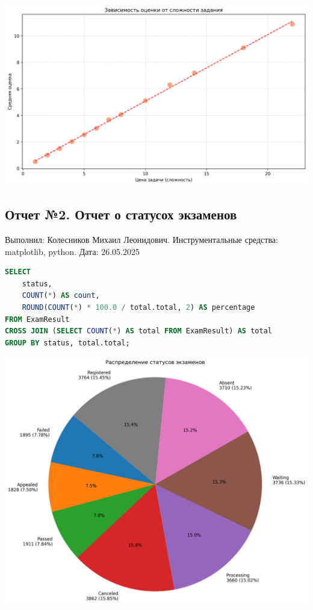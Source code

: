 \documentclass[a4paper]{article}
\begin{document}
\includegraphics[width=14cm]{data/plots/task_price_vs_grade.png}
\newpage
\subsection{Отчет №2. Отчет о статусох экзаменов}
Выполнил: Колесников Михаил Леонидович.
Инструментальные средства: matplotlib, python.
Дата: 26.05.2025

\begin{lstlisting}[language=SQL, frame=none, numbers=none, caption={2. Круговая диаграмма статусов экзаменов}]
SELECT
    status,
    COUNT(*) AS count,
    ROUND(COUNT(*) * 100.0 / total.total, 2) AS percentage
FROM ExamResult
CROSS JOIN (SELECT COUNT(*) AS total FROM ExamResult) AS total
GROUP BY status, total.total;
            \end{lstlisting}
\includegraphics[width=14cm]{data/plots/exam_statuses_distribution.png}
\newpage
\end{document}
